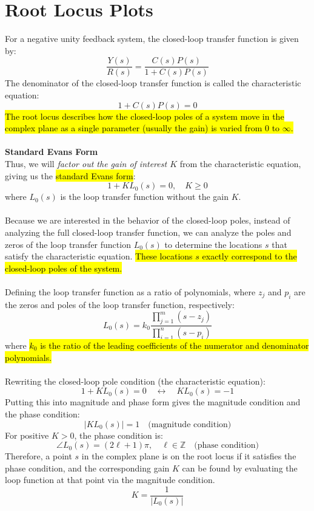 ﻿\documentclass[12pt]{article}
\begin{document}
\section*{Root Locus Plots}
For a negative unity feedback system, the closed-loop transfer function is given by:
\[\frac{Y(s)}{R(s)} = \frac{C(s)P(s)}{1+ C(s)P(s)}\]
The denominator of the closed-loop transfer function is called the characteristic equation:
\[1 + C(s)P(s) = 0\]
\hl{The root locus describes how the closed-loop poles of a system move in the complex plane as a single parameter (usually the gain) is varied from $0$ to $\infty$.}\\\\
\textbf{Standard Evans Form}\\
Thus, we will \textit{factor out the gain of interest $K$} from the characteristic equation, giving us the \hl{standard Evans form}:
\[\boxed{1+ K L_0 (s) =0, \quad K\geq 0}\]
where $L_0(s)$ is the loop transfer function without the gain $K$.\\\\
Because we are interested in the behavior of the closed-loop poles, instead of analyzing the full closed-loop transfer function, we can analyze the poles and zeros of the loop transfer function \(L_0(s)\) to determine the locations \(s\) that satisfy the characteristic equation. \hl{These locations $s$ exactly correspond to the closed-loop poles of the system.}\\\\
Defining the loop transfer function as a ratio of polynomials, where $z_j$ and $p_i$ are the zeros and poles of the loop transfer function, respectively:
\[
L_0(s)=k_0\frac{\displaystyle\prod_{j=1}^{m}(s-z_j)}{\displaystyle\prod_{i=1}^{n}(s-p_i)}
\]
where \hl{$k_0$ is the ratio of the leading coefficients of the numerator and denominator polynomials.}\\\\
Rewriting the closed-loop pole condition (the characteristic equation):
\[1+ K L_0 (s) =0 \quad \leftrightarrow \quad KL_0(s) = -1\]
Putting this into magnitude and phase form gives the magnitude condition and the phase condition:
\[\boxed{|K L_0(s)| = 1 \quad \text{(magnitude condition)}}\]
For positive $K>0$, the phase condition is:
\[ \boxed{\angle{L_0(s)} = (2\ell+1)\pi,\quad \ell \in \mathbb{Z}\quad \text{(phase condition)}}\]
Therefore, a point $s$ in the complex plane is on the root locus if it satisfies the phase condition, and the corresponding gain $K$ can be found by evaluating the loop function at that point via the magnitude condition.
\[K = \frac{1}{|L_0(s)|}\]
\end{document}
